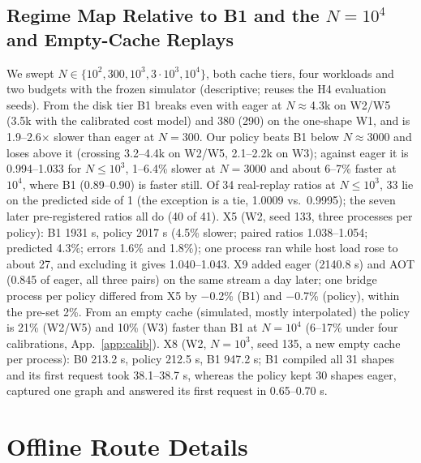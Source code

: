 \documentclass[conference]{IEEEtran}
\newcommand{\tn}[1]{#1}%
\begin{document}
\subsection{Regime Map Relative to B1 and the $N{=}10^4$ and Empty-Cache Replays}\label{sec:regime}
We swept $N\in\{10^2,300,10^3,3\cdot10^3,10^4\}$, both cache tiers, four workloads and two budgets with the frozen simulator (descriptive; reuses the H4 evaluation seeds). From the disk tier B1 breaks even with eager at $N{\approx}$\tn{4.3k} on W2/W5 (\tn{3.5k} with the calibrated cost model) and \tn{380} (\tn{290}) on the one-shape W1, and is \tn{1.9--2.6}$\times$ slower than eager at $N{=}300$. Our policy beats B1 below $N{\approx}3000$ and loses above it (crossing \tn{3.2--4.4k} on W2/W5, \tn{2.1--2.2k} on W3); against eager it is \tn{0.994--1.033} for $N{\le}10^3$, \tn{1--6.4\%} slower at $N{=}3000$ and about \tn{6--7\%} faster at $10^4$, where B1 (\tn{0.89--0.90}) is faster still. Of 34 real-replay ratios at $N{\le}10^3$, \tn{33} lie on the predicted side of 1 (the exception is a tie, \tn{1.0009} vs.\ \tn{0.9995}); the seven later pre-registered ratios all do (\tn{40 of 41}). X5 (W2, seed 133, three processes per policy): B1 \tn{1931 s}, policy \tn{2017 s} (\tn{4.5\%} slower; paired ratios \tn{1.038--1.054}; predicted \tn{4.3\%}; errors \tn{1.6\%} and \tn{1.8\%}); one process ran while host load rose to about 27, and excluding it gives \tn{1.040--1.043}. X9 added eager (\tn{2140.8 s}) and AOT (\tn{0.845} of eager, all three pairs) on the same stream a day later; one bridge process per policy differed from X5 by \tn{$-$0.2\%} (B1) and \tn{$-$0.7\%} (policy), within the pre-set 2\%. From an empty cache (simulated, mostly interpolated) the policy is \tn{21\%} (W2/W5) and \tn{10\%} (W3) faster than B1 at $N{=}10^4$ (\tn{6--17\%} under four calibrations, App.~\ref{app:calib}). X8 (W2, $N{=}10^3$, seed 135, a new empty cache per process): B0 \tn{213.2 s}, policy \tn{212.5 s}, B1 \tn{947.2 s}; B1 compiled all \tn{31} shapes and its first request took \tn{38.1--38.7 s}, whereas the policy kept \tn{30} shapes eager, captured one graph and answered its first request in \tn{0.65--0.70 s}.

\section{Offline Route Details}\label{sec:offline}
\end{document}

